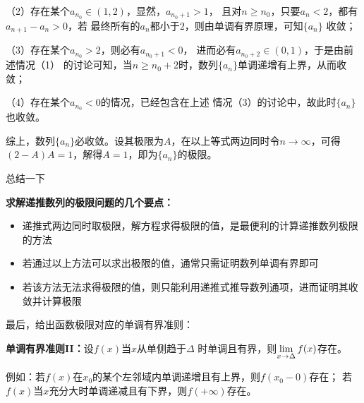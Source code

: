 （2）存在某个$a_{n_0}\in(1,2)$，显然，$a_{n_0+1}>1$，
且对$n\geq n_0$，只要$a_n<2$，都有$a_{n+1}-a_n>0$，若
最终所有的$a_n$都小于$2$，则由单调有界原理，可知$\{a_n\}$
收敛；

（3）存在某个$a_{n_0}>2$，则必有$a_{n_0+1}<0$，
进而必有$a_{n_0+2}\in(0,1)$，于是由前述情况（1）
的讨论可知，当$n\geq n_0+2$时，数列$\{a_n\}$单调递增有上界，从而收敛；

（4）存在某个$a_{n_0}<0$的情况，已经包含在上述
情况（3）的讨论中，故此时$\{a_n\}$也收敛。

综上，数列$\{a_n\}$必收敛。设其极限为$A$，在以上等式两边同时令$n\to\infty$，可得
$(2-A)A=1$，解得$A=1$，即为$\{a_n\}$的极限。\fin
\fi

总结一下
\begin{thx}
	{\bf 求解递推数列的极限问题的几个要点：}
	\begin{itemize}
	  \item 递推式两边同时取极限，解方程求得极限的值，是最便利的计算递推数列极限的方法
	  \item 若通过以上方法可以求出极限的值，通常只需证明数列单调有界即可
	  \item 若该方法无法求得极限的值，则只能利用递推式推导数列通项，进而证明其收敛并计算极限
	\end{itemize}
\end{thx}

\bs
最后，给出函数极限对应的单调有界准则：
\begin{thx}
{\bf 单调有界准则II：}设$f(x)$当$x$从单侧趋于$\Delta$
时单调且有界，则$\lim\limits_{x\to{\Delta}}f(x)$存在。
\end{thx}

例如：若$f(x)$在$x_0$的某个左邻域内单调递增且有上界，则$f(x_0-0)$存在；
若$f(x)$当$x$充分大时单调递减且有下界，则$f(+\infty)$存在。

